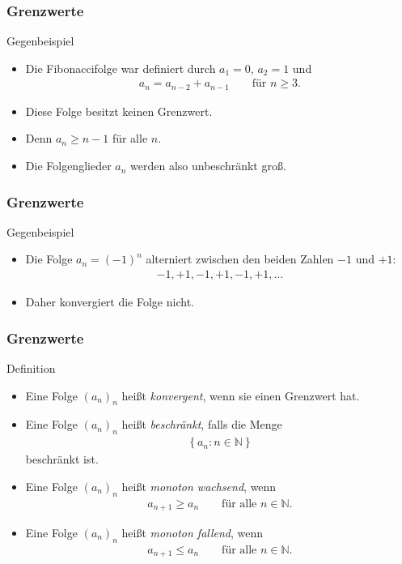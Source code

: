 \documentclass{beamer}
\renewcommand{\emph}[1]{{\textcolor{solarizedRed}{\itshape #1}}}
\newcommand\NN{\mathbb N}
\newcommand\cbc[1]{\left\{{#1}\right\}}
\renewcommand{\ae}{\"a}
\newcommand{\ue}{\"u}
\newcommand{\mytitle}{Grenzwerte}
\begin{document}
\begin{frame}\frametitle{\mytitle}
	\begin{block}{Gegenbeispiel}
		\begin{itemize}
			\item Die Fibonaccifolge war definiert durch $a_1=0$, $a_2=1$ und 
				\begin{align*}
					a_n=a_{n-2}+a_{n-1}\qquad\mbox{f\ue r $n\geq3$}.
				\end{align*}
			\item Diese Folge besitzt keinen Grenzwert.
			\item Denn $a_n\geq n-1$ f\ue r alle $n$.
			\item Die Folgenglieder $a_n$ werden also unbeschr\ae nkt gro\ss.
		\end{itemize}
	\end{block}
\end{frame}

\begin{frame}\frametitle{\mytitle}
	\begin{block}{Gegenbeispiel}
		\begin{itemize}
			\item Die Folge $a_n=(-1)^n$ alterniert zwischen den beiden Zahlen $-1$ und $+1$:
				\begin{align*}
				-1,+1,-1,+1,-1,+1,\ldots
				\end{align*}
			\item Daher konvergiert die Folge nicht.
		\end{itemize}
	\end{block}
\end{frame}

\begin{frame}\frametitle{\mytitle}
	\begin{block}{Definition}
	\begin{itemize}
		\item Eine Folge $(a_n)_n$ hei\ss t \emph{konvergent}, wenn sie einen Grenzwert hat.
		\item Eine Folge $(a_n)_n$ hei\ss t \emph{beschr\ae nkt}, falls die Menge
			\begin{align*}
				\cbc{a_n:n\in\NN}
			\end{align*}
			beschr\ae nkt ist.
		\item Eine Folge $(a_n)_n$ hei\ss t \emph{monoton wachsend}, wenn
			\begin{align*}
				a_{n+1}\geq a_n\qquad\mbox{f\ue r alle }n\in\NN.
			\end{align*}
		\item Eine Folge $(a_n)_n$ hei\ss t \emph{monoton fallend}, wenn
			\begin{align*}
				a_{n+1}\leq a_n\qquad\mbox{f\ue r alle }n\in\NN.
			\end{align*}
	\end{itemize}
	\end{block}
\end{frame}
\end{document}

